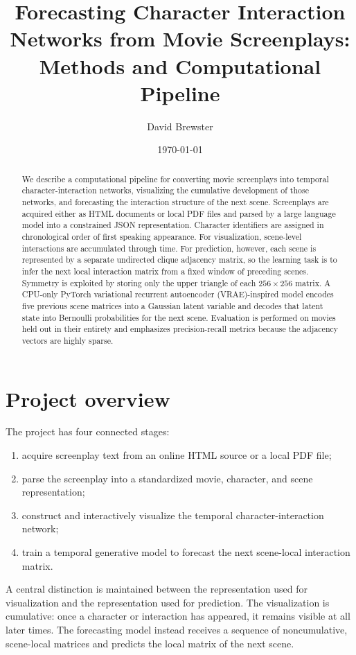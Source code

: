 \documentclass[11pt]{article}
\title{Forecasting Character Interaction Networks from Movie Screenplays:\\Methods and Computational Pipeline}
\author{David Brewster}
\date{\today}
\begin{document}
\maketitle

\begin{abstract}
We describe a computational pipeline for converting movie screenplays into temporal character-interaction networks, visualizing the cumulative development of those networks, and forecasting the interaction structure of the next scene. Screenplays are acquired either as HTML documents or local PDF files and parsed by a large language model into a constrained JSON representation. Character identifiers are assigned in chronological order of first speaking appearance. For visualization, scene-level interactions are accumulated through time. For prediction, however, each scene is represented by a separate undirected clique adjacency matrix, so the learning task is to infer the next local interaction matrix from a fixed window of preceding scenes. Symmetry is exploited by storing only the upper triangle of each $256\times256$ matrix. A CPU-only PyTorch variational recurrent autoencoder (VRAE)-inspired model encodes five previous scene matrices into a Gaussian latent variable and decodes that latent state into Bernoulli probabilities for the next scene. Evaluation is performed on movies held out in their entirety and emphasizes precision-recall metrics because the adjacency vectors are highly sparse.
\end{abstract}

\section{Project overview}

The project has four connected stages:

\begin{enumerate}[leftmargin=2em]
  \item acquire screenplay text from an online HTML source or a local PDF file;
  \item parse the screenplay into a standardized movie, character, and scene representation;
  \item construct and interactively visualize the temporal character-interaction network;
  \item train a temporal generative model to forecast the next scene-local interaction matrix.
\end{enumerate}

A central distinction is maintained between the representation used for visualization and the representation used for prediction. The visualization is cumulative: once a character or interaction has appeared, it remains visible at all later times. The forecasting model instead receives a sequence of noncumulative, scene-local matrices and predicts the local matrix of the next scene.
\end{document}
